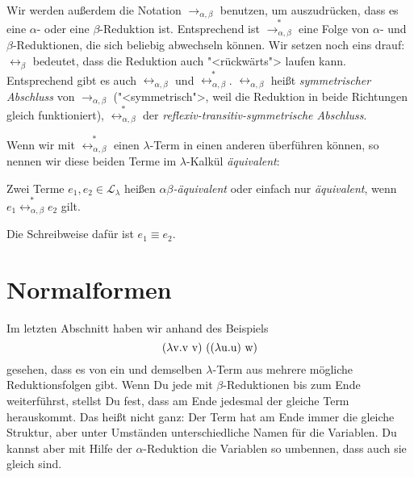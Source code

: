 Wir werden außerdem die Notation $\rightarrow_{\alpha,\beta}$
benutzen, um auszudrücken, dass es eine $\alpha$- oder eine
$\beta$-Reduktion ist.  Entsprechend ist
$\overset{\ast}{\rightarrow_{\alpha,\beta}}$ eine Folge von $\alpha$-
und $\beta$-Reduktionen, die sich beliebig abwechseln können.  Wir
setzen noch eins drauf: $\leftrightarrow_\beta$ bedeutet, dass die
Reduktion auch "<rückwärts"> laufen kann.  Entsprechend gibt es auch
$\leftrightarrow_{\alpha, \beta}$ und
$\overset{\ast}{\leftrightarrow_{\alpha,\beta}}$.
$\leftrightarrow_{\alpha, \beta}$ heißt \textit{symmetrischer
  Abschluss} von $\rightarrow_{\alpha,
  \beta}$ ("<symmetrisch">, weil die Reduktion in beide Richtungen
gleich funktioniert), $\overset{\ast}{\leftrightarrow_{\alpha,\beta}}$
der \textit{reflexiv-transitiv-symmetrische Abschluss}.

Wenn wir mit $\overset{\ast}{\leftrightarrow_{\alpha,\beta}}$ einen
$\lambda$-Term in einen anderen überführen können, so nennen wir diese
beiden Terme im $\lambda$-Kalkül 
\textit{äquivalent}:
%
\begin{definition}
  Zwei Terme $e_1, e_2\in\mathcal{L}_{\lambda}$ heißen
  \textit{$\alpha\beta$-äquivalent} oder einfach nur
  \textit{äquivalent}, wenn
  \(e_1 \overset{\ast}{\leftrightarrow_{\alpha,\beta}} e_2\)
  gilt.

  Die Schreibweise dafür ist \(e_1\equiv e_2\).
\end{definition}

\section{Normalformen}
\label{sec:normalformen}


Im letzten Abschnitt haben wir anhand des Beispiels
\begin{displaymath}
(\lambda \mathrm v .\mathrm v~\mathrm v)~((\lambda \mathrm u.\mathrm u)~\mathrm w)
\end{displaymath}
%
gesehen, dass es von ein und demselben $\lambda$-Term aus mehrere
mögliche Reduktionsfolgen gibt.  Wenn Du jede mit $\beta$-Reduktionen
bis zum Ende weiterführst, stellst Du fest, dass am Ende jedesmal der
gleiche Term herauskommt.  Das heißt nicht ganz: Der Term hat am Ende
immer die gleiche Struktur, aber unter Umständen unterschiedliche
Namen für die Variablen.  Du kannst aber mit Hilfe der
$\alpha$-Reduktion die Variablen so umbennen, dass auch sie gleich sind.

